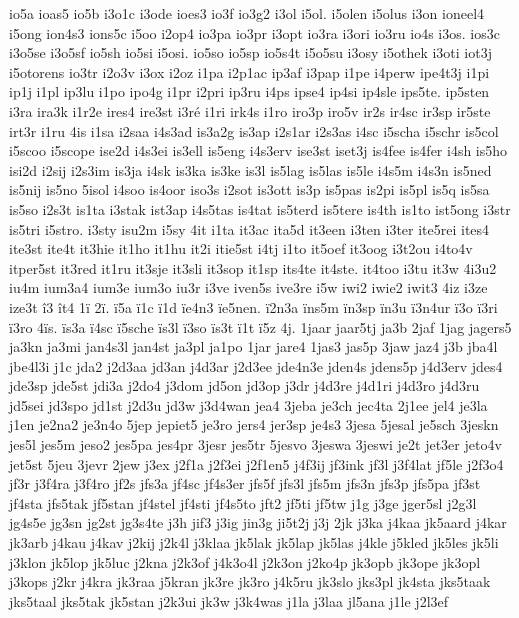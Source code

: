 {io5a
ioas5
io5b
i3o1c
i3ode
ioes3
io3f
io3g2
i3ol
i5ol.
i5olen
i5olus
i3on
ioneel4
i5ong
ion4s3
ions5c
i5oo
i2op4
io3pa
io3pr
i3opt
io3ra
i3ori
io3ru
io4s
i3os.
ios3c
i3o5se
i3o5sf
io5sh
io5si
i5osi.
io5so
io5sp
io5s4t
i5o5su
i3osy
i5othek
i3oti
iot3j
i5otorens
io3tr
i2o3v
i3ox
i2oz
i1pa
i2p1ac
ip3af
i3pap
i1pe
i4perw
ipe4t3j
i1pi
ip1j
i1pl
ip3lu
i1po
ipo4g
i1pr
i2pri
ip3ru
i4ps
ipse4
ip4si
ip4sle
ips5te.
ip5sten
i3ra
ira3k
i1r2e
ires4
ire3st
i3ré
i1ri
irk4s
i1ro
iro3p
iro5v
ir2s
ir4sc
ir3sp
ir5ste
irt3r
i1ru
4is
i1sa
i2saa
i4s3ad
is3a2g
is3ap
i2s1ar
i2s3as
i4sc
i5scha
i5schr
is5col
i5scoo
i5scope
ise2d
i4s3ei
is3ell
is5eng
i4s3erv
ise3st
iset3j
is4fee
is4fer
i4sh
is5ho
isi2d
i2sij
i2s3im
is3ja
i4sk
is3ka
is3ke
is3l
is5lag
is5las
is5le
i4s5m
i4s3n
is5ned
is5nij
is5no
5isol
i4soo
is4oor
iso3s
i2sot
is3ott
is3p
is5pas
is2pi
is5pl
is5q
is5sa
is5so
i2s3t
is1ta
i3stak
ist3ap
i4s5tas
is4tat
is5terd
is5tere
is4th
is1to
ist5ong
i3str
is5tri
i5stro.
i3sty
isu2m
i5sy
4it
i1ta
it3ac
ita5d
it3een
i3ten
i3ter
ite5rei
ites4
ite3st
ite4t
it3hie
it1ho
it1hu
it2i
itie5st
i4tj
i1to
it5oef
it3oog
i3t2ou
i4to4v
itper5st
it3red
it1ru
it3sje
it3sli
it3sop
it1sp
its4te
it4ste.
it4too
i3tu
it3w
4i3u2
iu4m
ium3a4
ium3e
ium3o
iu3r
i3ve
iven5s
ive3re
i5w
iwi2
iwie2
iwit3
4iz
i3ze
ize3t
î3
ît4
1ï
2ï.
ï5a
ï1c
ï1d
ïe4n3
ïe5nen.
ï2n3a
ïns5m
ïn3sp
ïn3u
ï3n4ur
ï3o
ï3ri
ï3ro
4ïs.
ïs3a
ï4sc
ï5sche
ïs3l
ï3so
ïs3t
ï1t
ï5z
4j.
1jaar
jaar5tj
ja3b
2jaf
1jag
jagers5
ja3kn
ja3mi
jan4s3l
jan4st
ja3pl
ja1po
1jar
jare4
1jas3
jas5p
3jaw
jaz4
j3b
jba4l
jbe4l3i
j1c
jda2
j2d3aa
jd3an
j4d3ar
j2d3ee
jde4n3e
jden4s
jdens5p
j4d3erv
jdes4
jde3sp
jde5st
jdi3a
j2do4
j3dom
jd5on
jd3op
j3dr
j4d3re
j4d1ri
j4d3ro
j4d3ru
jd5sei
jd3spo
jd1st
j2d3u
jd3w
j3d4wan
jea4
3jeba
je3ch
jec4ta
2j1ee
jel4
je3la
j1en
je2na2
je3n4o
5jep
jepiet5
je3ro
jers4
jer3sp
je4s3
3jesa
5jesal
je5sch
3jeskn
jes5l
jes5m
jeso2
jes5pa
jes4pr
3jesr
jes5tr
5jesvo
3jeswa
3jeswi
je2t
jet3er
jeto4v
jet5st
5jeu
3jevr
2jew
j3ex
j2f1a
j2f3ei
j2f1en5
j4f3ij
jf3ink
jf3l
j3f4lat
jf5le
j2f3o4
jf3r
j3f4ra
j3f4ro
jf2s
jfs3a
jf4sc
jf4s3er
jfs5f
jfs3l
jfs5m
jfs3n
jfs3p
jfs5pa
jf3st
jf4sta
jfs5tak
jf5stan
jf4stel
jf4sti
jf4s5to
jft2
jf5ti
jf5tw
j1g
j3ge
jger5sl
j2g3l
jg4s5e
jg3sn
jg2st
jg3s4te
j3h
jif3
j3ig
jin3g
ji5t2j
j3j
2jk
j3ka
j4kaa
jk5aard
j4kar
jk3arb
j4kau
j4kav
j2kij
j2k4l
j3klaa
jk5lak
jk5lap
jk5las
j4kle
j5kled
jk5les
jk5li
j3klon
jk5lop
jk5luc
j2kna
j2k3of
j4k3o4l
j2k3on
j2ko4p
jk3opb
jk3ope
jk3opl
j3kops
j2kr
j4kra
jk3raa
j5kran
jk3re
jk3ro
j4k5ru
jk3slo
jks3pl
jk4sta
jks5taak
jks5taal
jks5tak
jk5stan
j2k3ui
jk3w
j3k4was
j1la
j3laa
jl5ana
j1le
j2l3ef
}
